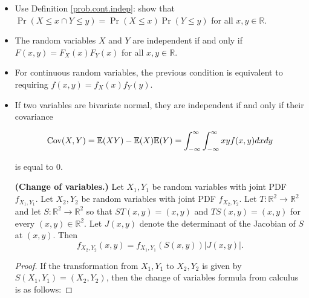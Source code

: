 \begin{itemize}

\item Use Definition \ref{prob.cont.indep}: show that \(\Pr(X \leq x \cap Y \leq y) = \Pr(X \leq x) \Pr(Y \leq y)\) for all \(x, y \in \mathbb{R}\).

\item \begin{theorem}The random variables \(X\) and \(Y\) are independent if and only if  \(F(x, y) = F_X(x) F_Y(x)\) for all \(x, y \in \mathbb{R}\). \end{theorem}

\item \begin{proposition}For continuous random variables, the previous condition is equivalent to requiring \(f(x,y) = f_X(x) f_Y(y)\).\end{proposition}

\item \begin{theorem}\label{prob.bivariate.norm.indep} If two variables are bivariate normal, they are independent if and only if their covariance

\[
\Cov(X, Y) = \E(XY) - \E(X)\E(Y) = \int_{-\infty}^\infty \int_{-\infty}^\infty xy f(x, y) dx dy
\]

is equal to 0. \end{theorem}

\begin{theorem}\label{prob.change.vars} \textbf{(Change of variables.)} Let $X_{1},Y_{1}$ be random variables with joint PDF $f_{X_{1},Y_{1}}$.  Let $X_{2},Y_{2}$ be random variables with joint PDF $f_{X_{2},Y_{2}}$.  Let $T : \mathbb{R}^{2}\to\mathbb{R}^{2}$ and let $S : \mathbb{R}^{2}\to\mathbb{R}^{2}$ so that $ST(x,y)=(x,y)$ and $TS(x,y)=(x,y)$ for every $(x,y)\in\mathbb{R}^{2}$.  Let $J(x,y)$ denote the determinant of the Jacobian of $S$ at $(x,y)$.  Then
$$f_{X_{2},Y_{2}}(x,y)=f_{X_{1},Y_{1}}(S(x,y))\left|J(x,y)\right|.$$

%
%

\end{theorem}

\begin{proof} If the transformation from \(X_1, Y_1\) to \(X_2, Y_2\) is given by \(S(X_1, Y_1) = (X_2, Y_2)\), then the change of variables formula from calculus is as follows: 


\end{proof}
\end{itemize}
